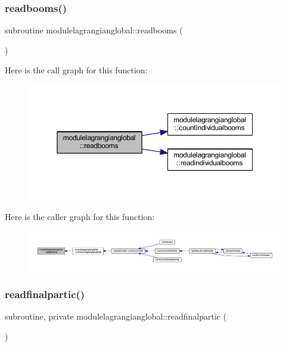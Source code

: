 \subsubsection{\texorpdfstring{readbooms()}{readbooms()}}
{\footnotesize\ttfamily subroutine modulelagrangianglobal\+::readbooms (\begin{DoxyParamCaption}{ }\end{DoxyParamCaption})\hspace{0.3cm}{\ttfamily [private]}}

Here is the call graph for this function\+:\nopagebreak
\begin{figure}[H]
\begin{center}
\leavevmode
\includegraphics[width=350pt]{namespacemodulelagrangianglobal_ae6c369ad79b4c62328e4792cd7aed791_cgraph}
\end{center}
\end{figure}
Here is the caller graph for this function\+:\nopagebreak
\begin{figure}[H]
\begin{center}
\leavevmode
\includegraphics[width=350pt]{namespacemodulelagrangianglobal_ae6c369ad79b4c62328e4792cd7aed791_icgraph}
\end{center}
\end{figure}
\mbox{\label{namespacemodulelagrangianglobal_a101ffba4c1f5b064fc15cf4cd92df60e}} 
\subsubsection{\texorpdfstring{readfinalpartic()}{readfinalpartic()}}
{\footnotesize\ttfamily subroutine, private modulelagrangianglobal\+::readfinalpartic (\begin{DoxyParamCaption}{ }\end{DoxyParamCaption})\hspace{0.3cm}{\ttfamily [private]}}

